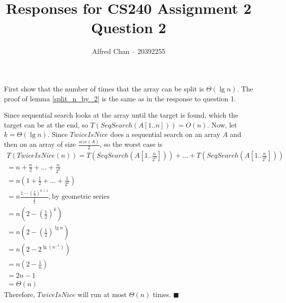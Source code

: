 \documentclass[12pt]{article}
\title{Responses for CS240 Assignment 2 Question 2}
\author{Alfred Chan -- 20392255}
\begin{document}
\maketitle
First show that the number of times that the array can be split is $\Theta(\lg n)$. The proof of lemma \ref{split_n_by_2} is the same as in the response to question 1.

Since sequential search looks at the array until the target is found, which the target can be at the end, so $T(SeqSearch(A[1..n])) = O(n)$.
Now, let $k = \Theta(\lg n)$.
Since $TwiceIsNice$ does a sequential search on an array $A$ and then on an array of size $\frac{size(A)}{2}$, so the worst case is
\begin{gather*}
T(TwiceIsNice(n)) = T(SeqSearch(A[1..\frac{n}{2^0}])) + \dots + T(SeqSearch(A[1 .. \frac{n}{2^k}]))\\
	= n + \frac{n}{2} + \dots + \frac{n}{2^k}\\
	= n (1 + \frac{1}{2} + \dots + \frac{1}{2^k})\\
	= n \frac{1 - (\frac{1}{2})^{k+1}}{\frac{1}{2}}, \text{by geometric series}\\
	= n (2 - (\frac{1}{2})^{k})\\
	= n (2 - (\frac{1}{2})^{\lg n})\\
	= n (2 - 2^{\lg (n^{-1})})\\
	= n (2 - \frac{1}{n})\\
	= 2n - 1\\
	= \Theta(n)
\end{gather*}
Therefore, $TwiceIsNice$ will run at most $\Theta(n)$ times.
\hfill $\blacksquare$
\end{document}
